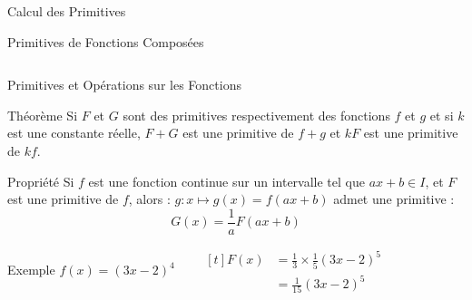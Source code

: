 \documentclass{coursbook}
\begin{document}
\begin{Gpartie}{Calcul des Primitives}
\begin{Spartie}{Primitives de Fonctions Composées}
\begin{table}[H]
\begin{tabular}[c]{ @{}*{3}{C}@{} }
                \end{tabular}
            \end{table}
        \end{Spartie}
        \pagebreak
        \begin{Spartie}{Primitives et Opérations sur les Fonctions} 
            \begin{SSpartie}{Théorème} 
                Si $F$ et $G$ sont des primitives respectivement des fonctions $f$ et $g$ et si $k$ est une constante réelle, $F+G$ est une primitive de $f+g$ et $kF$ est une primitive de $kf$.
            \end{SSpartie}
            \begin{SSpartie}{Propriété} 
                Si $f$ est une fonction continue sur un intervalle tel que $ax+b\in I$, et $F$ est une primitive de $f$, alors : $g:x\mapsto g(x)=f(ax+b)$ admet une primitive :
                \[G(x)=\frac{1}{a}F(ax+b)\]
                \begin{SSSpartie}{Exemple} 
                    $f(x)=(3x-2)^4\qquad
                    \begin{aligned}[t]
                        F(x)&=\tfrac{1}{3}\times\tfrac{1}{5}(3x-2)^5 \\
                        &=\tfrac{1}{15}(3x-2)^5
                    \end{aligned}$
                \end{SSSpartie}
            \end{SSpartie}
        \end{Spartie}
    \end{Gpartie}
\end{document}
